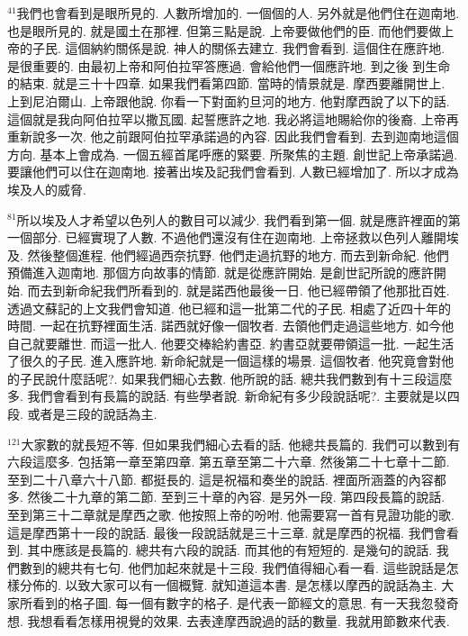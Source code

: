 \documentclass{book}
\begin{document}
$^{41}$我們也會看到是眼所見的.
人數所增加的.
一個個的人.
另外就是他們住在迦南地.
也是眼所見的.
就是國土在那裡.
但第三點是說.
上帝要做他們的臣.
而他們要做上帝的子民.
這個納約關係是說.
神人的關係去建立.
我們會看到.
這個住在應許地.
是很重要的.
由最初上帝和阿伯拉罕答應過.
會給他們一個應許地.
到之後 到生命的結束.
就是三十十四章.
如果我們看第四節.
當時的情景就是.
摩西要離開世上.
上到尼泊爾山.
上帝跟他說.
你看一下對面約旦河的地方.
他對摩西說了以下的話.
這個就是我向阿伯拉罕以撒瓦國.
起誓應許之地.
我必將這地賜給你的後裔.
上帝再重新說多一次.
他之前跟阿伯拉罕承諾過的內容.
因此我們會看到.
去到迦南地這個方向.
基本上會成為.
一個五經首尾呼應的緊要.
所聚焦的主題.
創世記上帝承諾過.
要讓他們可以住在迦南地.
接著出埃及記我們會看到.
人數已經增加了.
所以才成為埃及人的威脅.

$^{81}$所以埃及人才希望以色列人的數目可以減少.
我們看到第一個.
就是應許裡面的第一個部分.
已經實現了人數.
不過他們還沒有住在迦南地.
上帝拯救以色列人離開埃及.
然後整個進程.
他們經過西奈抗野.
他們走過抗野的地方.
而去到新命紀.
他們預備進入迦南地.
那個方向故事的情節.
就是從應許開始.
是創世記所說的應許開始.
而去到新命紀我們所看到的.
就是諾西他最後一日.
他已經帶領了他那批百姓.
透過文蘇記的上文我們會知道.
他已經和這一批第二代的子民.
相處了近四十年的時間.
一起在抗野裡面生活.
諾西就好像一個牧者.
去領他們走過這些地方.
如今他自己就要離世.
而這一批人.
他要交棒給約書亞.
約書亞就要帶領這一批.
一起生活了很久的子民.
進入應許地.
新命紀就是一個這樣的場景.
這個牧者.
他究竟會對他的子民說什麼話呢?.
如果我們細心去數.
他所說的話.
總共我們數到有十三段這麼多.
我們會看到有長篇的說話.
有些學者說.
新命紀有多少段說話呢?.
主要就是以四段.
或者是三段的說話為主.

$^{121}$大家數的就長短不等.
但如果我們細心去看的話.
他總共長篇的.
我們可以數到有六段這麼多.
包括第一章至第四章.
第五章至第二十六章.
然後第二十七章十二節.
至到二十八章六十八節.
都挺長的.
這是祝福和奏坐的說話.
裡面所涵蓋的內容都多.
然後二十九章的第二節.
至到三十章的內容.
是另外一段.
第四段長篇的說話.
至到第三十二章就是摩西之歌.
他按照上帝的吩咐.
他需要寫一首有見證功能的歌.
這是摩西第十一段的說話.
最後一段說話就是三十三章.
就是摩西的祝福.
我們會看到.
其中應該是長篇的.
總共有六段的說話.
而其他的有短短的.
是幾句的說話.
我們數到的總共有七句.
他們加起來就是十三段.
我們值得細心看一看.
這些說話是怎樣分佈的.
以致大家可以有一個概覽.
就知道這本書.
是怎樣以摩西的說話為主.
大家所看到的格子圖.
每一個有數字的格子.
是代表一節經文的意思.
有一天我忽發奇想.
我想看看怎樣用視覺的效果.
去表達摩西說過的話的數量.
我就用節數來代表.
\end{document}
